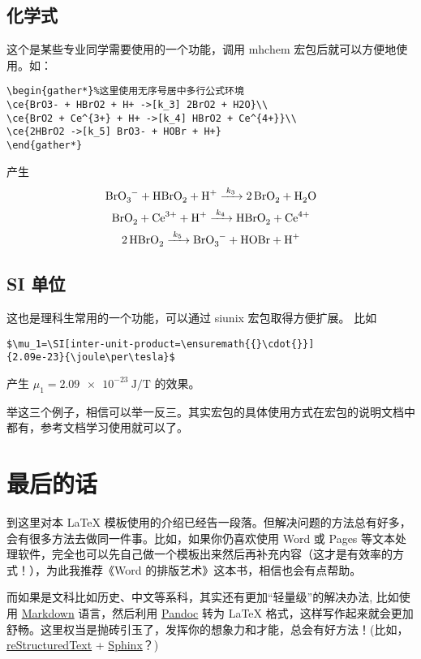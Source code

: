 \subsection{化学式}
这个是某些专业同学需要使用的一个功能，调用 mhchem 宏包后就可以方便地使用。如：
\begin{Verbatim}[frame=single]
\begin{gather*}%这里使用无序号居中多行公式环境
\ce{BrO3- + HBrO2 + H+ ->[k_3] 2BrO2 + H2O}\\
\ce{BrO2 + Ce^{3+} + H+ ->[k_4] HBrO2 + Ce^{4+}}\\
\ce{2HBrO2 ->[k_5] BrO3- + HOBr + H+}
\end{gather*}
\end{Verbatim}
产生
\begin{gather*}%
\ce{BrO3- + HBrO2 + H+ ->[k_3] 2BrO2 + H2O}\\
\ce{BrO2 + Ce^{3+} + H+ ->[k_4] HBrO2 + Ce^{4+}}\\
\ce{2HBrO2 ->[k_5] BrO3- + HOBr + H+}
\end{gather*}

\subsection{SI 单位}
这也是理科生常用的一个功能，可以通过 siunix 宏包取得方便扩展。
比如 
\begin{Verbatim}[frame=single]
$\mu_1=\SI[inter-unit-product=\ensuremath{{}\cdot{}}]
{2.09e-23}{\joule\per\tesla}$
\end{Verbatim}
产生 $\mu_1=\SI[inter-unit-product=\ensuremath{{}\cdot{}}]{2.09e-23}{\joule\per\tesla}$ 的效果。

举这三个例子，相信可以举一反三。其实宏包的具体使用方式在宏包的说明文档中都有，参考文档学习使用就可以了。
\section{最后的话}
到这里对本 LaTeX 模板使用的介绍已经告一段落。但解决问题的方法总有好多，会有很多方法去做同一件事。比如，如果你仍喜欢使用 Word 或 Pages 等文本处理软件，完全也可以先自己做一个模板出来然后再补充内容（这才是有效率的方式！），为此我推荐《Word 的排版艺术》这本书，相信也会有点帮助。

而如果是文科比如历史、中文等系科，其实还有更加“轻量级”的解决办法, 比如使用 \href{http://zh.wikipedia.org/wiki/Markdown}{Markdown} 语言，然后利用 \href{http://johnmacfarlane.net/pandoc/}{Pandoc} 转为 LaTeX 格式，这样写作起来就会更加舒畅。这里权当是抛砖引玉了，发挥你的想象力和才能，总会有好方法！(比如，\href{http://docutils.sourceforge.net/rst.html}{reStructuredText} + \href{http://www.pythondoc.com/sphinx/}{Sphinx}？)
